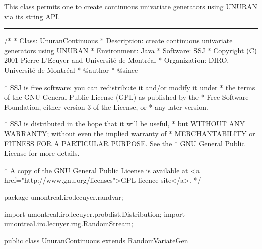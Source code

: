 
This class permits one to create continuous univariate
generators using UNURAN via its string API.

\bigskip\hrule

\begin{code}
\begin{hide}
/*
 * Class:        UnuranContinuous
 * Description:  create continuous univariate generators using UNURAN
 * Environment:  Java
 * Software:     SSJ 
 * Copyright (C) 2001  Pierre L'Ecuyer and Université de Montréal
 * Organization: DIRO, Université de Montréal
 * @author       
 * @since

 * SSJ is free software: you can redistribute it and/or modify it under
 * the terms of the GNU General Public License (GPL) as published by the
 * Free Software Foundation, either version 3 of the License, or
 * any later version.

 * SSJ is distributed in the hope that it will be useful,
 * but WITHOUT ANY WARRANTY; without even the implied warranty of
 * MERCHANTABILITY or FITNESS FOR A PARTICULAR PURPOSE.  See the
 * GNU General Public License for more details.

 * A copy of the GNU General Public License is available at
   <a href="http://www.gnu.org/licenses">GPL licence site</a>.
 */
\end{hide}
package umontreal.iro.lecuyer.randvar;\begin{hide}
import umontreal.iro.lecuyer.probdist.Distribution;
import umontreal.iro.lecuyer.rng.RandomStream;
\end{hide}

public class UnuranContinuous extends RandomVariateGen\begin{hide} {

   private RandUnuran unuran = new RandUnuran();
\end{hide}\end{code}

